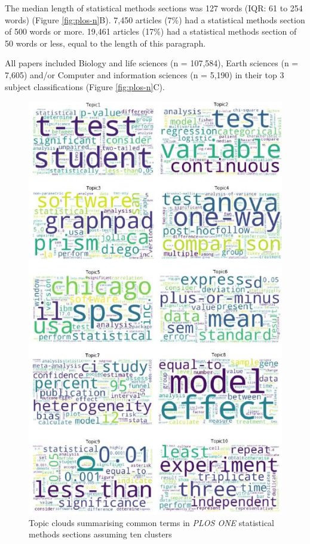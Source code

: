 \documentclass[12pt]{article}
\begin{document}
The median length of statistical methods sections was 127 words (IQR: 61
to 254 words) (Figure \ref{fig:plos-n}B). 7,450 articles (7\%) had a
statistical methods section of 500 words or more. 19,461 articles (17\%)
had a statistical methods section of 50 words or less, equal to the
length of this paragraph.

All papers included Biology and life sciences (n = 107,584), Earth
sciences (n = 7,605) and/or Computer and information sciences (n =
5,190) in their top 3 subject classifications (Figure
\ref{fig:plos-n}C).

\begin{figure}
\centering
\includegraphics{figures/figure2.jpg}
\caption{\label{fig:plot-10-topics}Topic clouds summarising common terms
in \emph{PLOS ONE} statistical methods sections assuming ten clusters}
\end{figure}
\end{document}
